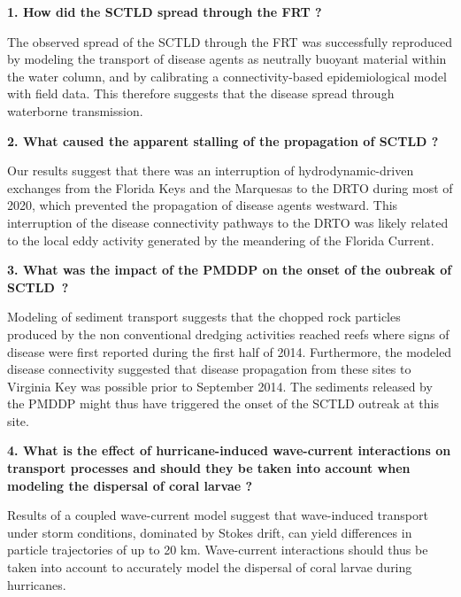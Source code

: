 \begin{list}{}{%
    \setlength{\leftmargin}{0in}%
    }
    \item \textbf{1. How did the SCTLD spread through the FRT ?}
    \begin{list}{}{\setlength{\topsep}{0pt}}
        \item The observed spread of the SCTLD through the FRT was successfully reproduced by modeling the transport of disease agents as neutrally buoyant material within the water column, and by calibrating a connectivity-based epidemiological model with field data. This therefore suggests that the disease spread through waterborne transmission. 
    \end{list}
    \item \textbf{2. What caused the apparent stalling of the propagation of SCTLD ?}
    \begin{list}{}{\setlength{\topsep}{0pt}}
        \item Our results suggest that there was an interruption of hydrodynamic-driven exchanges from the Florida Keys and the Marquesas to the DRTO during most of 2020, which prevented the propagation of disease agents westward. This interruption of the disease connectivity pathways to the DRTO was likely related to the local eddy activity generated by the meandering of the Florida Current.
    \end{list}
    \item \textbf{3. What was the impact of the PMDDP on the onset of the oubreak of SCTLD~?}
    \begin{list}{}{\setlength{\topsep}{0pt}}
        \item Modeling of sediment transport suggests that the chopped rock particles produced by the non conventional dredging activities reached reefs where signs of disease were first reported during the first half of 2014. Furthermore, the modeled disease connectivity suggested that disease propagation from these sites to Virginia Key was possible prior to September 2014. The sediments released by the PMDDP might thus have triggered the onset of the SCTLD outreak at this site.
    \end{list}
    \item  \textbf{4. What is the effect of hurricane-induced wave-current interactions on transport processes and should they be taken into account when modeling the dispersal of coral larvae ?}
    \begin{list}{}{\setlength{\topsep}{0pt}}
        \item Results of a coupled wave-current model suggest that wave-induced transport under storm conditions, dominated by Stokes drift, can yield differences in particle trajectories of up to 20 km. Wave-current interactions should thus be taken into account to accurately model the dispersal of coral larvae during hurricanes.
    \end{list}
\end{list}


